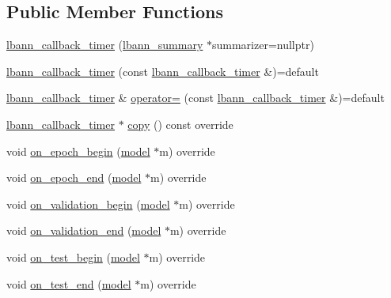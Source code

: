 \subsection*{Public Member Functions}
\begin{DoxyCompactItemize}
\item 
\hyperlink{classlbann_1_1lbann__callback__timer_a00fc86ddf14a4a5e9c6b65ff2e81dfb6}{lbann\+\_\+callback\+\_\+timer} (\hyperlink{classlbann_1_1lbann__summary}{lbann\+\_\+summary} $\ast$summarizer=nullptr)
\item 
\hyperlink{classlbann_1_1lbann__callback__timer_afc366dc61b7d8af5ddce879e46255ee1}{lbann\+\_\+callback\+\_\+timer} (const \hyperlink{classlbann_1_1lbann__callback__timer}{lbann\+\_\+callback\+\_\+timer} \&)=default
\item 
\hyperlink{classlbann_1_1lbann__callback__timer}{lbann\+\_\+callback\+\_\+timer} \& \hyperlink{classlbann_1_1lbann__callback__timer_ab7548a88159197f64dfc319f3e777c2a}{operator=} (const \hyperlink{classlbann_1_1lbann__callback__timer}{lbann\+\_\+callback\+\_\+timer} \&)=default
\item 
\hyperlink{classlbann_1_1lbann__callback__timer}{lbann\+\_\+callback\+\_\+timer} $\ast$ \hyperlink{classlbann_1_1lbann__callback__timer_a9ea5c598723debb7b098a6ce891571c6}{copy} () const override
\item 
void \hyperlink{classlbann_1_1lbann__callback__timer_aceecdd208aa8d75a49a41a33bf48314b}{on\+\_\+epoch\+\_\+begin} (\hyperlink{classlbann_1_1model}{model} $\ast$m) override
\item 
void \hyperlink{classlbann_1_1lbann__callback__timer_a95ccee037894dbb5e3c663fbdfbc9d7f}{on\+\_\+epoch\+\_\+end} (\hyperlink{classlbann_1_1model}{model} $\ast$m) override
\item 
void \hyperlink{classlbann_1_1lbann__callback__timer_aa86c0ae1b6fbc878b6ba9a4551b803b8}{on\+\_\+validation\+\_\+begin} (\hyperlink{classlbann_1_1model}{model} $\ast$m) override
\item 
void \hyperlink{classlbann_1_1lbann__callback__timer_a0fea502078111627d340340a63768f9f}{on\+\_\+validation\+\_\+end} (\hyperlink{classlbann_1_1model}{model} $\ast$m) override
\item 
void \hyperlink{classlbann_1_1lbann__callback__timer_a9fb5327fa629c23e51c9c3b065d6d8c5}{on\+\_\+test\+\_\+begin} (\hyperlink{classlbann_1_1model}{model} $\ast$m) override
\item 
void \hyperlink{classlbann_1_1lbann__callback__timer_ab7db32c743128f8bcfc35c8ea56c226a}{on\+\_\+test\+\_\+end} (\hyperlink{classlbann_1_1model}{model} $\ast$m) override

\end{DoxyCompactItemize}
